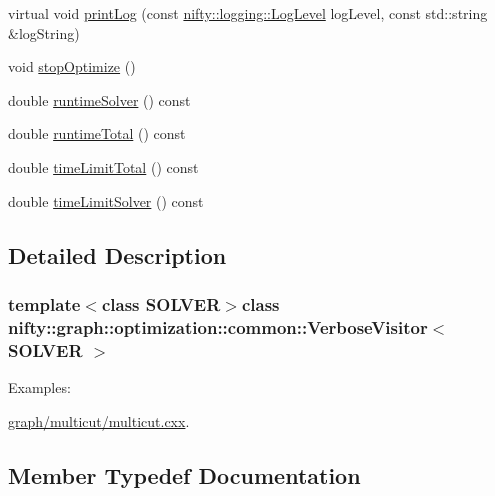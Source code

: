 \begin{DoxyCompactItemize}
virtual void \hyperlink{classnifty_1_1graph_1_1optimization_1_1common_1_1VerboseVisitor_a93095c23297c621c346768045896e541}{print\+Log} (const \hyperlink{namespacenifty_1_1logging_a3385625f9a0dbb17f70c47d3fca2f64d}{nifty\+::logging\+::\+Log\+Level} log\+Level, const std\+::string \&log\+String)
\item 
void \hyperlink{classnifty_1_1graph_1_1optimization_1_1common_1_1VerboseVisitor_a25a835d59de67abe5273874d7b282354}{stop\+Optimize} ()
\item 
double \hyperlink{classnifty_1_1graph_1_1optimization_1_1common_1_1VerboseVisitor_aa64c9a340dfe98024eabc1b2b821138a}{runtime\+Solver} () const 
\item 
double \hyperlink{classnifty_1_1graph_1_1optimization_1_1common_1_1VerboseVisitor_a1de8dbe55325711428a93352888b7df8}{runtime\+Total} () const 
\item 
double \hyperlink{classnifty_1_1graph_1_1optimization_1_1common_1_1VerboseVisitor_a7f781c5188962960470d5af7919b4b0e}{time\+Limit\+Total} () const 
\item 
double \hyperlink{classnifty_1_1graph_1_1optimization_1_1common_1_1VerboseVisitor_ad866c89e0f89adaec4dece682de2bd85}{time\+Limit\+Solver} () const 
\end{DoxyCompactItemize}


\subsection{Detailed Description}
\subsubsection*{template$<$class S\+O\+L\+V\+E\+R$>$class nifty\+::graph\+::optimization\+::common\+::\+Verbose\+Visitor$<$ S\+O\+L\+V\+E\+R $>$}

\begin{Desc}
\item[Examples\+: ]\par
\hyperlink{graph_2multicut_2multicut_8cxx-example}{graph/multicut/multicut.\+cxx}.\end{Desc}


\subsection{Member Typedef Documentation}
\hypertarget{classnifty_1_1graph_1_1optimization_1_1common_1_1VerboseVisitor_a5aa8c805242bf435548e2367674092d3}{}
